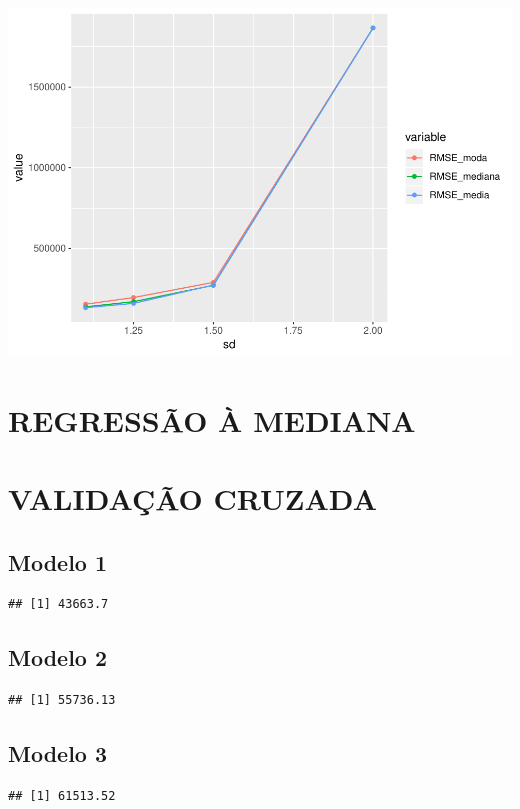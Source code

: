 \documentclass[]{article}
\begin{document}
\includegraphics{Impacto_sigma_files/figure-latex/unnamed-chunk-43-1.pdf}

\section{REGRESSÃO À MEDIANA}\label{regressao-a-mediana}

\section{VALIDAÇÃO CRUZADA}\label{validacao-cruzada-1}

\subsection{Modelo 1}\label{modelo-1-1}

\begin{verbatim}
## [1] 43663.7
\end{verbatim}

\subsection{Modelo 2}\label{modelo-2-1}

\begin{verbatim}
## [1] 55736.13
\end{verbatim}

\subsection{Modelo 3}\label{modelo-3-1}

\begin{verbatim}
## [1] 61513.52
\end{verbatim}
\end{document}
